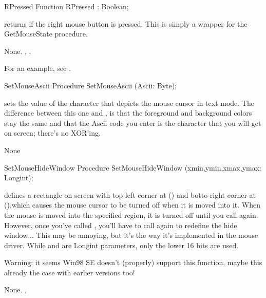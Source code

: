 \begin{function}{RPressed}
\Declaration
Function RPressed  : Boolean;

\Description

 returns  if the right mouse button is pressed.
This is simply a wrapper for the GetMouseState procedure.

\Errors
None.
\SeeAlso
{}, , 
\end{function}

For an example, see .

\begin{procedure}{SetMouseAscii}
\Declaration
Procedure SetMouseAscii (Ascii: Byte);

\Description

sets the  value of the character that depicts the mouse cursor in 
text mode.
The difference between this one and , is that the foreground
and background colors stay the same and that the Ascii code you enter is the
character that you will get on screen; there's no XOR'ing.

\Errors
None
\SeeAlso
{}
\end{procedure}


\begin{procedure}{SetMouseHideWindow}
\Declaration
Procedure SetMouseHideWindow (xmin,ymin,xmax,ymax: Longint);

\Description

defines a rectangle on screen with top-left corner at () and
botto-right corner at (),which causes the mouse cursor to be 
turned off when it is moved into it.
When the mouse is moved into the specified region, it is turned off until you
call  again. However, once you've called , you'll have to
call  again to redefine the hide window... 
This may be annoying, but it's the way it's implemented in the mouse driver.
While  and  are Longint parameters, 
only the lower 16 bits are used.

Warning: it seems Win98 SE doesn't (properly) support this function,
maybe this already the case with earlier versions too!

\Errors
None.
\SeeAlso
{}, 
\end{procedure}

